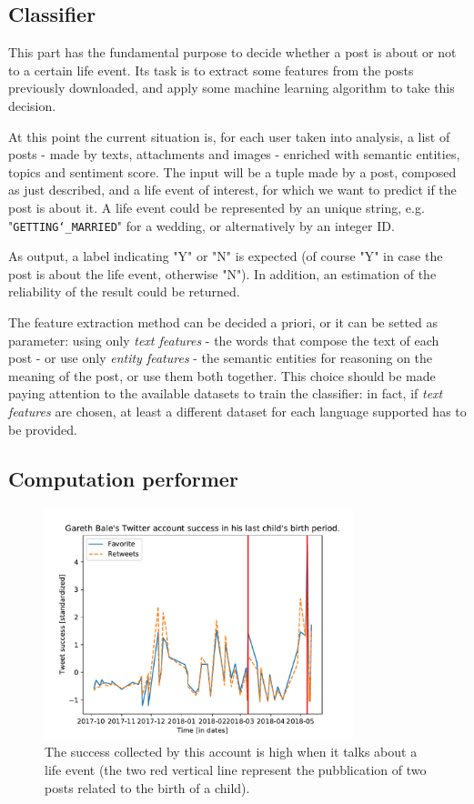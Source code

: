 \subsection{Classifier}
This part has the fundamental purpose to decide whether a post is about or not to a certain life event. Its task is to extract some features from the posts previously downloaded, and apply some machine learning algorithm to take this decision.

At this point the current situation is, for each user taken into analysis, a list of posts - made by texts, attachments and images - enriched with semantic entities, topics and sentiment score. The input will be a tuple made by a post, composed as just described, and a life event of interest, for which we want to predict if the post is about it. A life event could be represented by an unique string, e.g. "\texttt{GETTING\char`_MARRIED}" for a wedding, or alternatively by an integer ID.

As output, a label indicating "Y" or "N" is expected (of course "Y" in case the post is about the life event, otherwise "N"). In addition, an estimation of the reliability of the result could be returned.

The feature extraction method can be decided a priori, or it can be setted as parameter: using only \textit{text features} - the words that compose the text of each post - or use only \textit{entity features} - the semantic entities for reasoning on the meaning of the post, or use them both together. This choice should be made paying attention to the available datasets to train the classifier: in fact, if \textit{text features} are chosen, at least a different dataset for each language supported has to be provided.

\subsection{Computation performer}
\label{sec:computationperformer}

\begin{figure}
\centering
\includegraphics[width=%
0.8\textwidth]{img/bale}
\caption{The success collected by this account is high when it talks about a life event (the two red vertical line represent the pubblication of two posts related to the birth of a child).}
\label{fig:bale}
\end{figure}

